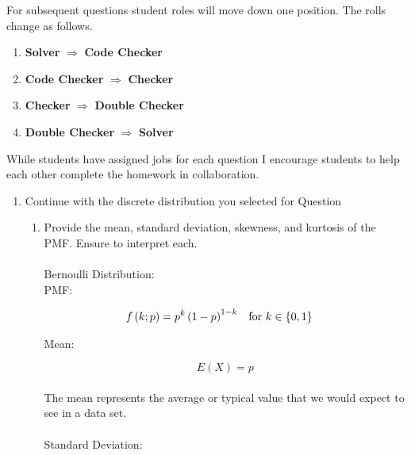 \documentclass{article}\usepackage[]{graphicx}\usepackage[]{color}
\begin{document}
\noindent For subsequent questions student roles will move down one position. The rolls change as follows.
\begin{enumerate}
  \item \textbf{Solver} $\Longrightarrow$ \textbf{Code Checker}
  \item \textbf{Code Checker} $\Longrightarrow$ \textbf{Checker}
  \item \textbf{Checker} $\Longrightarrow$ \textbf{Double Checker}
  \item \textbf{Double Checker} $\Longrightarrow$ \textbf{Solver}
\end{enumerate}
While students have assigned jobs for each question I encourage students to help 
each other complete the homework in collaboration.
\newpage
\begin{enumerate}
\item Continue with the discrete distribution you selected for Question %
\begin{enumerate}
  \item Provide the mean, standard deviation, skewness, and kurtosis of the PMF. 
  Ensure to interpret each.
\\
\\
Bernoulli Distribution:
\\



PMF:

\begin{align*}f\left(k;p\right) & =p^{k}\left(1-p\right)^{1-k} &  & \textrm{for \ensuremath{k\in\left\{ 0,1\right\} }}\end{align*}


Mean:

\[
E(X)=p
\]
\\
The mean represents the average or typical value that we would expect to see in a data set.\\
\\
Standard Deviation:


\end{enumerate}
\end{enumerate}
\end{document}
